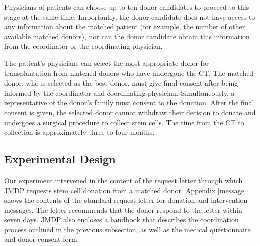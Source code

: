 \documentclass[12pt, a4paper]{article}
\begin{document}
Physicians of patients can choose up to ten donor candidates to proceed to this stage at the same time. Importantly, the donor candidate does not have access to any information about the matched patient (for example, the number of other available matched donors), nor can the donor candidate obtain this information from the coordinator or the coordinating physician.

The patient's physicians can select the most appropriate donor for transplantation from matched donors who have undergone the CT. The matched donor, who is selected as the best donor, must give final consent after being informed by the coordinator and coordinating physician. Simultaneously, a representative of the donor's family must consent to the donation.  After the final consent is given, the selected donor cannot withdraw their decision to donate and undergoes a surgical procedure to collect stem cells. The time from the CT to collection is approximately three to four months.

\hypertarget{design}{%
\subsection{Experimental Design}\label{design}}

Our experiment intervened in the content of the request letter through which JMDP requests stem cell donation from a matched donor. Appendix \ref{message} shows the contents of the standard request letter for donation and intervention messages. The letter recommends that the donor respond to the letter within seven days. JMDP also encloses a handbook that describes the coordination process outlined in the previous subsection, as well as the medical questionnaire and donor consent form.
\end{document}
